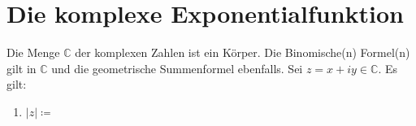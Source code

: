 \documentclass{article}
\begin{document}
\section{Die komplexe Exponentialfunktion}
Die Menge $\mathbb{C}$ der komplexen Zahlen ist ein Körper. Die Binomische(n) Formel(n) gilt in $\mathbb{C}$ und die geometrische Summenformel
ebenfalls. Sei $z=x+iy \in \mathbb{C}$. Es gilt:
\begin{enumerate}
    \item $|z| \coloneqq$
\end{enumerate}
\end{document}
